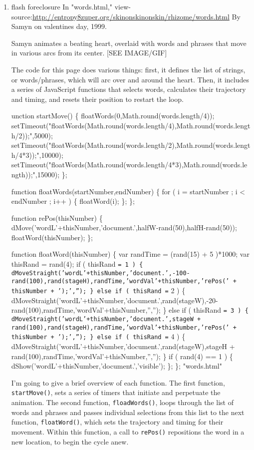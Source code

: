 \documentclass[11pt]{article}
\begin{document}
\begin{enumerate}

\item flash foreclosure
\label{sec:org0eeffca}
In "words.html,"
view-source:\url{http://entropy8zuper.org/skinonskinonskin/rhizome/words.html}
By Samyn on valentines day, 1999.

Samyn animates a beating heart, overlaid with words and phrases that
move in various arcs from its center. [SEE IMAGE/GIF]

The code for this page does various things: first, it defines the list
of strings, or words/phrases, which will arc over and around the
heart. Then, it includes a series of JavaScript functions that selects
words, calculates their trajectory and timing, and resets their
position to restart the loop.
\begin{SOURCE}
unction startMove()
\{
floatWords(0,Math.round(words.length/4));
setTimeout("floatWords(Math.round(words.length/4),Math.round(words.length/2));",5000);
setTimeout("floatWords(Math.round(words.length/2),Math.round(words.length/4*3));",10000);
setTimeout("floatWords(Math.round(words.length/4*3),Math.round(words.length));",15000);
\};

function floatWords(startNumber,endNumber)
\{
for ( i = startNumber ; i < endNumber ; i++ ) \{ floatWord(i); \};
\};

function rePos(thisNumber)
\{
dMove('wordL'+thisNumber,'document.',halfW-rand(50),halfH-rand(50));
floatWord(thisNumber);
\};

function floatWord(thisNumber)
\{
var randTime = (rand(15) + 5 )*1000;
var thisRand = rand(4);
if ( thisRand \texttt{= 1 ) \{ dMoveStraight('wordL'+thisNumber,'document.',-100-rand(100),rand(stageH),randTime,'wordVal'+thisNumber,'rePos(' + thisNumber + ');',''); \}
else if ( thisRand =} 2 ) \{ dMoveStraight('wordL'+thisNumber,'document.',rand(stageW),-20-rand(100),randTime,'wordVal'+thisNumber,'',''); \}
else if ( thisRand \texttt{= 3 ) \{ dMoveStraight('wordL'+thisNumber,'document.',stageW + rand(100),rand(stageH),randTime,'wordVal'+thisNumber,'rePos(' + thisNumber + ');',''); \}
else if ( thisRand =} 4 ) \{ dMoveStraight('wordL'+thisNumber,'document.',rand(stageW),stageH + rand(100),randTime,'wordVal'+thisNumber,'',''); \}
if ( rand(4) == 1 ) \{ dShow('wordL'+thisNumber,'document.','visible'); \};
\}; "words.html"
\end{SOURCE}
I'm going to give a brief overview of each function. The first
function, \texttt{startMove()}, sets a series of timers that initiate and
perpetuate the animation. The second function, \texttt{floadWords()}, loops
through the list of words and phrases and passes individual selections
from this list to the next function, \texttt{floatWord()}, which sets the
trajectory and timing for their movement. Within this function, a call
to \texttt{rePos()} repositions the word in a new location, to begin the
cycle anew. 


\end{enumerate}
\end{document}
